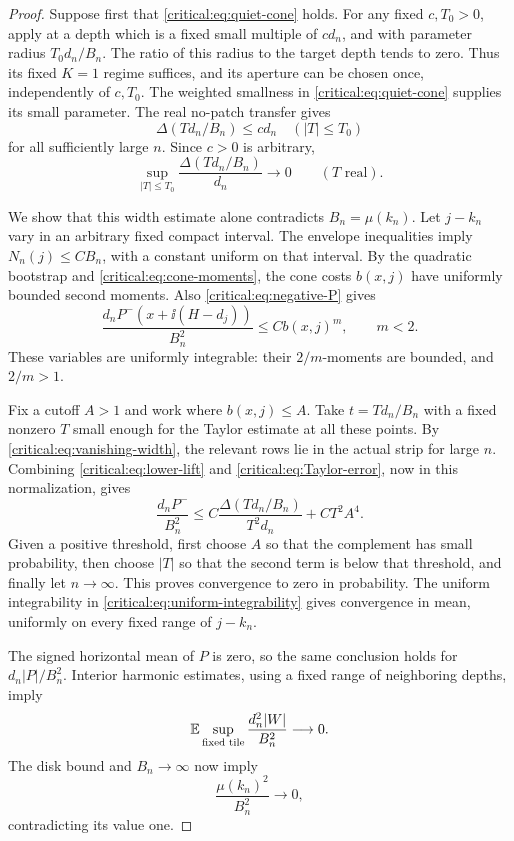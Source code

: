 \begin{proof}
Suppose first that \eqref{critical:eq:quiet-cone} holds. For any fixed
\(c,T_0>0\), apply  at a depth which is a fixed
small multiple of \(c d_n\), and with parameter radius
\(T_0d_n/B_n\). The ratio of this radius to the target depth tends
to zero. Thus its fixed \(K=1\) regime suffices, and its aperture
can be chosen once, independently of \(c,T_0\). The weighted
smallness in \eqref{critical:eq:quiet-cone} supplies its small
parameter. The real no-patch transfer gives
\[
 \Delta(Td_n/B_n)\le c d_n
 \quad (|T|\le T_0)
\]
for all sufficiently large \(n\). Since \(c>0\) is arbitrary,
\begin{equation}\label{critical:eq:vanishing-width}
 \sup_{|T|\le T_0}\frac{\Delta(Td_n/B_n)}{d_n}\longrightarrow0
 \qquad(T\text{ real}).
\end{equation}

We show that this width estimate alone contradicts
\(B_n=\mu(k_n)\). Let \(j-k_n\) vary in an arbitrary fixed compact
interval. The envelope inequalities imply \(N_n(j)\le C B_n\),
with a constant uniform on that interval. By the quadratic bootstrap
and \eqref{critical:eq:cone-moments}, the cone costs \(b(x,j)\)
have uniformly bounded second moments. Also
\eqref{critical:eq:negative-P} gives
\begin{equation}\label{critical:eq:uniform-integrability}
 \frac{d_nP^-(x+\ii(H-d_j))}{B_n^2}\le C b(x,j)^m,
 \qquad m<2.
\end{equation}
These variables are uniformly integrable: their \(2/m\)-moments
are bounded, and \(2/m>1\).

Fix a cutoff \(A>1\) and work where \(b(x,j)\le A\). Take
\(t=T d_n/B_n\) with a fixed nonzero \(T\) small enough for the
Taylor estimate at all these points. By
\eqref{critical:eq:vanishing-width}, the relevant rows lie in the
actual strip for large \(n\). Combining
\eqref{critical:eq:lower-lift} and
\eqref{critical:eq:Taylor-error}, now in this normalization, gives
\[
 \frac{d_nP^-}{B_n^2}
 \le C\frac{\Delta(Td_n/B_n)}{T^2d_n}+C T^2 A^4.
\]
Given a positive threshold, first choose \(A\) so that the complement
has small probability, then choose \(|T|\) so that the second term
is below that threshold, and finally let \(n\to\infty\). This
proves convergence to zero in probability. The uniform integrability
in \eqref{critical:eq:uniform-integrability} gives convergence in
mean, uniformly on every fixed range of \(j-k_n\).

The signed horizontal mean of \(P\) is zero, so the same conclusion
holds for \(d_n|P|/B_n^2\). Interior harmonic estimates, using a
fixed range of neighboring depths, imply
\[
 \mathbb E\sup_{\text{fixed tile}}
       \frac{d_n^2|W|}{B_n^2}\longrightarrow0.
\]
The disk bound and \(B_n\to\infty\) now imply
\[
 \frac{\mu(k_n)^2}{B_n^2}\longrightarrow0,
\]
contradicting its value one.


\end{proof}
